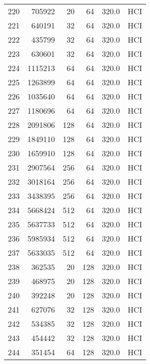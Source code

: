 \begin{longtable}{lrrrrl}
220 &    705922 &         20 &        64 &          320.0 &  HCI \\
221 &    640191 &         32 &        64 &          320.0 &  HCI \\
222 &    435799 &         32 &        64 &          320.0 &  HCI \\
223 &    630601 &         32 &        64 &          320.0 &  HCI \\
224 &   1115213 &         64 &        64 &          320.0 &  HCI \\
225 &   1263899 &         64 &        64 &          320.0 &  HCI \\
226 &   1035640 &         64 &        64 &          320.0 &  HCI \\
227 &   1180696 &         64 &        64 &          320.0 &  HCI \\
228 &   2091806 &        128 &        64 &          320.0 &  HCI \\
229 &   1849110 &        128 &        64 &          320.0 &  HCI \\
230 &   1659910 &        128 &        64 &          320.0 &  HCI \\
231 &   2907564 &        256 &        64 &          320.0 &  HCI \\
232 &   3018164 &        256 &        64 &          320.0 &  HCI \\
233 &   3438395 &        256 &        64 &          320.0 &  HCI \\
234 &   5668424 &        512 &        64 &          320.0 &  HCI \\
235 &   5637733 &        512 &        64 &          320.0 &  HCI \\
236 &   5985934 &        512 &        64 &          320.0 &  HCI \\
237 &   5633035 &        512 &        64 &          320.0 &  HCI \\
238 &    362535 &         20 &       128 &          320.0 &  HCI \\
239 &    468975 &         20 &       128 &          320.0 &  HCI \\
240 &    392248 &         20 &       128 &          320.0 &  HCI \\
241 &    627076 &         32 &       128 &          320.0 &  HCI \\
242 &    534385 &         32 &       128 &          320.0 &  HCI \\
243 &    454442 &         32 &       128 &          320.0 &  HCI \\
244 &    351454 &         64 &       128 &          320.0 &  HCI \\

\end{longtable}
